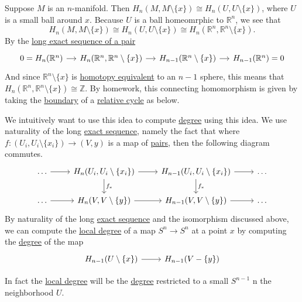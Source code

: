 \begin{answer}
	Suppose \(M\) is an \(n\)-manifold. Then \(H_n(M, M \setminus \{x\}) \cong H_n(U, U \setminus \{x\})\), where \(U\) is a small ball around \(x\).
	Because \(U\) is a ball homeomrphic to \(\mathbb{R} ^n\), we see that
	\[
		H_n(M, M \setminus \{x\}) \cong H_n(U, U \setminus \{x\}) \cong H_n(\mathbb{R} ^n, \mathbb{R} ^n \setminus \{x\}).
	\]
	By the \hyperref[thm:long-exact-sequence-of-a-pair]{long exact sequence of a pair}
	\[
		\begin{tikzcd}[column sep=small]
			{0=H_n(\mathbb{R}^n)} & {H_n(\mathbb{R}^n, \mathbb{R}^n\setminus\{x\})} & {H_{n-1}(\mathbb{R}^n\setminus\{x\})} & {H_{n-1}(\mathbb{R}^n)=0}
			\arrow[from=1-1, to=1-2]
			\arrow[from=1-2, to=1-3]
			\arrow[from=1-3, to=1-4]
		\end{tikzcd}
	\]
	And since \(\mathbb{R}^n \setminus \{x\}\) is \hyperref[def:homotopy-equivalence]{homotopy equivalent} to an \(n - 1\) sphere, this means that
	\(H_n(\mathbb{R} ^n, \mathbb{R} ^n \setminus \{x\}) \cong \mathbb{Z} \). By homework, this
	connecting homomorphism is given by taking the \hyperref[def:boundary]{boundary} of a \hyperref[def:relative-cycle]{relative cycle} as below.
	\begin{figure}[H]
		\centering
		\label{fig:connecting-homomorphism-relative-homology-rn}
	\end{figure}

	We intuitively want to use this idea to compute \hyperref[def:degree]{degree} using this idea. We use naturality of the long \hyperref[def:exact-sequence]{exact sequence},
	namely the fact that where \(f \colon (U_i, U_i \setminus \{x_i\}) \to (V, y)\) is a map of \hyperref[def:good-pair]{pairs}, then the following diagram commutes.
	\[
		\begin{tikzcd}
			\dots & {H_n(U_i, U_i\setminus\{x_i\})} & {H_{n-1}(U_i, U_i\setminus\{x_i\})} & \dots \\
			\dots & {H_n(V, V\setminus\{y\})} & {H_{n-1}(V, V\setminus\{y\})} & \dots
			\arrow[from=1-1, to=1-2]
			\arrow[from=1-2, to=1-3]
			\arrow[from=1-3, to=1-4]
			\arrow["{f_\ast}", from=1-3, to=2-3]
			\arrow[from=2-3, to=2-4]
			\arrow[from=2-2, to=2-3]
			\arrow["{f_\ast}", from=1-2, to=2-2]
			\arrow[from=2-1, to=2-2]
		\end{tikzcd}
	\]
	By naturality of the long \hyperref[def:exact-sequence]{exact sequence} and the isomorphism discussed above, we can compute the \hyperref[def:local-degree]{local degree}
	of a map \(S^n \to S^n\) at a point \(x\) by computing the \hyperref[def:degree]{degree} of the map
	\[
		\begin{tikzcd}
			{H_{n-1}(U\setminus\{x\})} & {H_{n-1}(V-\{y\})}
			\arrow[from=1-1, to=1-2]
		\end{tikzcd}
	\]

	In fact the \hyperref[def:local-degree]{local degree} will be the \hyperref[def:degree]{degree} restricted to a small \(S^{n - 1}\) n the neighborhood \(U\).
	\begin{figure}[H]
		\centering
		\label{fig:computing-local-homology-idea}
	\end{figure}
\end{answer}


